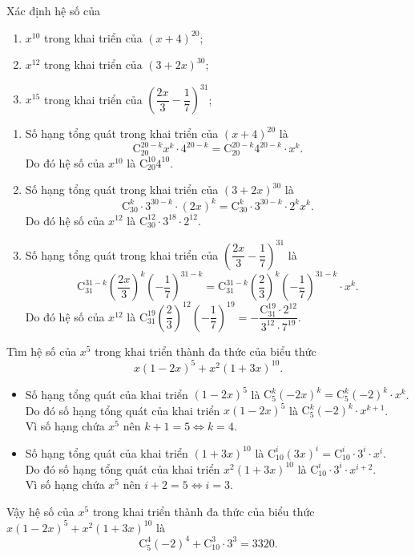 \begin{bt}%
%
Xác định hệ số của
\begin{enumerate}
\item $x^{10}$ trong khai triển của $(x+4)^{20}$;
\item $x^{12}$ trong khai triển của $(3+2x)^{30}$;
\item $x^{15}$ trong khai triển của $\left(\dfrac{2x}{3}-\dfrac{1}{7}\right)^{31}$;
\end{enumerate}
\loigiai
{
\begin{enumerate}
\item Số hạng tổng quát trong khai triển của $(x+4)^{20}$ là $$\mathrm{C}_{20}^{20-k}x^k\cdot 4^{20-k}=\mathrm{C}_{20}^{20-k}4^{20-k}\cdot x^k.$$
Do đó hệ số của $x^{10}$ là $\mathrm{C}_{20}^{10}4^{10}$.
\item Số hạng tổng quát trong khai triển của $(3+2x)^{30}$ là $$\mathrm{C}_{30}^k\cdot 3^{30-k}\cdot (2x)^k=\mathrm{C}_{30}^k\cdot 3^{30-k}\cdot 2^kx^k.$$
Do đó hệ số của $x^{12}$ là $\mathrm{C}_{30}^{12}\cdot 3^{18}\cdot 2^{12}$.
\item Số hạng tổng quát trong khai triển của $\left(\dfrac{2x}{3}-\dfrac{1}{7}\right)^{31}$ là $$\mathrm{C}_{31}^{31-k}\left(\dfrac{2x}{3}\right)^k\left(-\dfrac{1}{7}\right)^{31-k}=\mathrm{C}_{31}^{31-k}\left(\dfrac{2}{3}\right)^k\left(-\dfrac{1}{7}\right)^{31-k}\cdot x^k.$$
Do đó hệ số của $x^{12}$ là $\mathrm{C}_{31}^{19}\left(\dfrac{2}{3}\right)^{12}\left(-\dfrac{1}{7}\right)^{19}=-\dfrac{\mathrm{C}_{31}^{19}\cdot 2^{12}}{3^{12}\cdot 7^{19}}$.
\end{enumerate}
}
\end{bt}

\begin{bt}%
%
Tìm hệ số của $x^5$ trong khai triển thành đa thức của biểu thức
$$x(1-2x)^5+x^2(1+3x)^{10}.$$
\loigiai
{
\begin{itemize}
\item Số hạng tổng quát của khai triển $(1-2x)^5$ là $\mathrm{C}_5^k(-2x)^k=\mathrm{C}_5^k(-2)^k\cdot x^k$.\\
Do đó số hạng tổng quát của khai triển $x(1-2x)^5$ là $\mathrm{C}_5^k(-2)^k\cdot x^{k+1}$.\\
Vì số hạng chứa $x^5$ nên $k+1=5\Leftrightarrow k=4$.
\item Số hạng tổng quát của khai triển $(1+3x)^{10}$ là $\mathrm{C}_{10}^i(3x)^i=\mathrm{C}_{10}^i\cdot 3^i\cdot x^i$.\\
Do đó số hạng tổng quát của khai triển $x^2(1+3x)^{10}$ là $\mathrm{C}_{10}^i\cdot 3^i\cdot x^{i+2}$.\\
Vì số hạng chứa $x^5$ nên $i+2=5\Leftrightarrow i=3$.
\end{itemize}
Vậy hệ số của $x^5$ trong khai triển thành đa thức của biểu thức
$x(1-2x)^5+x^2(1+3x)^{10}$ là
$$\mathrm{C}_5^4(-2)^4+\mathrm{C}_{10}^3\cdot 3^3=3320.$$
}
\end{bt}

